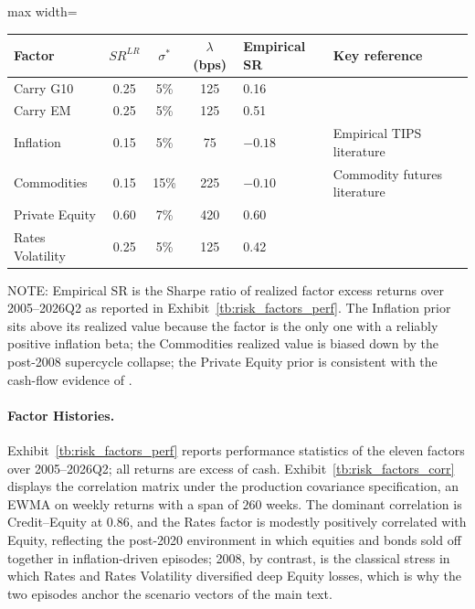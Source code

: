 \documentclass[pdftex,12pt,a4paper]{article}
\begin{document}
\begin{table}[H]
	\label{tab:sharpe_cal}\vspace*{-1.0\baselineskip}
	\begin{center}
		\small
		\begin{adjustbox}{max width=\textwidth}
		\begin{tabular}{lcccll}
			\toprule
			\textbf{Factor} & $SR^{LR}$ & $\sigma^*$ & $\lambda$ (bps) & \textbf{Empirical SR} & \textbf{Key reference} \\
			\midrule
			Carry G10 & 0.25 & 5\% & 125 & 0.16 & \cite{LustigRV2011} \\
			Carry EM & 0.25 & 5\% & 125 & 0.51 & \cite{LustigRV2011} \\
			Inflation & 0.15 & 5\% & 75  & $-0.18$ & Empirical TIPS literature \\
			Commodities & 0.15 & 15\% & 225 & $-0.10$ & Commodity futures literature \\
			Private Equity & 0.60 & 7\% & 420 & 0.60 & \cite{Ang2018} \\
			Rates Volatility & 0.25 & 5\% & 125 & 0.42 & \cite{Morris2026} \\
			\bottomrule
		\end{tabular}
		\end{adjustbox}
	\end{center}
	\small
	NOTE: Empirical SR is the Sharpe ratio of realized factor excess returns over 2005--2026Q2 as reported in Exhibit~\ref{tb:risk_factors_perf}. The Inflation prior sits above its realized value because the factor is the only one with a reliably positive inflation beta; the Commodities realized value is biased down by the post-2008 supercycle collapse; the Private Equity prior is consistent with the cash-flow evidence of \cite{Ang2018}.
\end{table}

\paragraph*{Factor Histories.} Exhibit~\ref{tb:risk_factors_perf} reports performance statistics of the eleven factors over 2005--2026Q2; all returns are excess of cash. Exhibit~\ref{tb:risk_factors_corr} displays the correlation matrix under the production covariance specification, an EWMA on weekly returns with a span of $260$ weeks. The dominant correlation is Credit--Equity at $0.86$, and the Rates factor is modestly positively correlated with Equity, reflecting the post-2020 environment in which equities and bonds sold off together in inflation-driven episodes; 2008, by contrast, is the classical stress in which Rates and Rates Volatility diversified deep Equity losses, which is why the two episodes anchor the scenario vectors of the main text.
\end{document}
